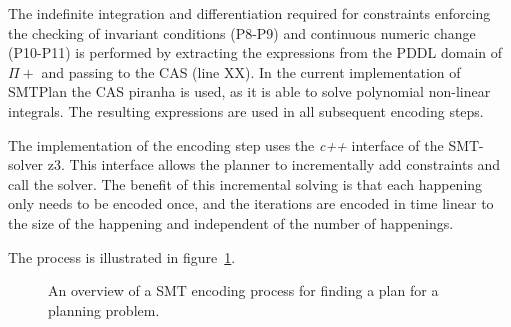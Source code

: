 The indefinite integration and differentiation required for constraints enforcing the checking of invariant conditions (P8-P9) and continuous numeric change (P10-P11) is performed by extracting the expressions from the PDDL domain of $\Pi+$ and passing to the CAS (line XX). In the current implementation of {\sc SMTPlan} the CAS {\sc piranha} is used, as it is able to solve polynomial non-linear integrals. The resulting expressions are used in all subsequent encoding steps.

The implementation of the encoding step uses the \textit{c++} interface of the SMT-solver {\sc z3}. This interface allows the planner to incrementally add constraints and call the solver. The benefit of this incremental solving is that each happening only needs to be encoded once, and the iterations are encoded in time linear to the size of the happening and independent of the number of happenings.

The process is illustrated in figure~\ref{fig:SMTPlan}.

\begin{figure}[ht]
\centering
%
\caption{An overview of a SMT encoding process for finding a plan for a planning problem. \color{red}{replace image completely}}
\label{fig:SMTPlan}
\end{figure}

